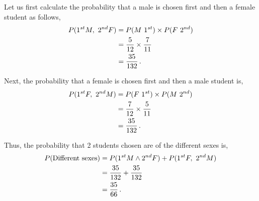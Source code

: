 \begin{subquestions}
\begin{subsubquestions}
\end{subsubquestions}


\subquestion

Let us first calculate the probability that a male is chosen first and then a female student as follows,
\begin{align}
	P(1^{st} M, ~2^{nd} F) & = P(M ~1^{st}) \times P(F ~2^{nd}) \nonumber \\
	                & = \frac{5}{12} \times \frac{7}{11} \nonumber \\
	                & = \frac{35}{132} \,. 
\end{align}

Next, the probability that a female is chosen first and then a male student is,
\begin{align}
	P(1^{st} F, ~2^{nd} M) & = P(F ~1^{st}) \times P(M ~2^{nd}) \nonumber \\
	& = \frac{7}{12} \times \frac{5}{11} \nonumber \\
	& = \frac{35}{132} \,. 
\end{align}

Thus, the probability that 2 students chosen are of the different sexes is,
\begin{align}
	P(\text{Different sexes}) & = P(1^{st} M \land 2^{nd} F) + P(1^{st} F, ~2^{nd} M) \nonumber \\
	                          & = \frac{35}{132} + \frac{35}{132} \nonumber \\
	                          & = \frac{35}{66} \,.
\end{align}

\end{subquestions}